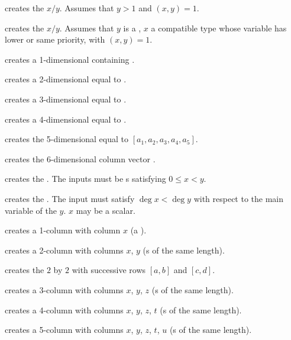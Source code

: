  creates the  $x/y$. Assumes that
$y > 1$ and $(x,y) = 1$.

 creates the  $x/y$. Assumes
that $y$ is a , $x$ a compatible type whose variable has lower
or same priority, with $(x,y) = 1$.

 creates a 1-dimensional  containing .

 creates a 2-dimensional  equal to
\kbd{[x,y]}.

 creates a 3-dimensional 
equal to \kbd{[x,y,z]}.

 creates a 4-dimensional 
equal to \kbd{[x,y,z,t]}.

 creates the
5-dimensional  equal to $[a_1,a_2,a_3,a_4,a_5]$.

creates the $6$-dimensional column vector \kbd{[x,y,z,t,u,v]~}.

 creates the  .
The inputs must be s satisfying $0 \leq x < y$.

 creates the  .
The input must satisfy $\deg x < \deg y$ with respect to the main variable of
the  $y$. $x$ may be a scalar.

 creates a 1-column  with column $x$
(a ).

 creates a 2-column  with columns
$x$, $y$ (s of the same length).

 creates the $2$ by $2$
 with successive rows $[a,b]$ and $[c,d]$.

 creates a 3-column  with columns
$x$, $y$, $z$ (s of the same length).

 creates a 4-column 
with columns $x$, $y$, $z$, $t$ (s of the same length).

 creates a 5-column
 with columns $x$, $y$, $z$, $t$, $u$ (s of the same
length).

